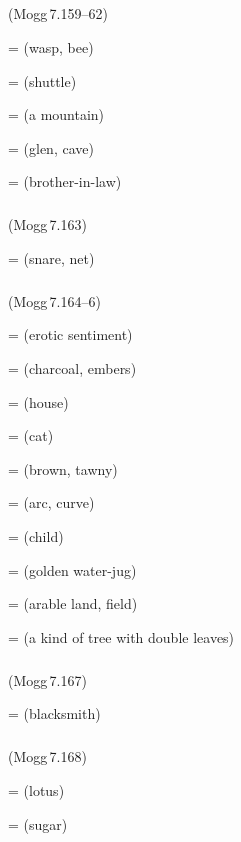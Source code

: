 \subparagraph*{} (Mogg\,7.159--62)\label{pacckx:ara}

 =  (wasp, bee)\par
{} =  (shuttle)\par
{} =  (a mountain)\par
{} =  (glen, cave)\par
{} =  (brother-in-law)\par

\subparagraph*{} (Mogg\,7.163)\label{pacckx:aradna}

 =  (snare, net)\par

\subparagraph*{} (Mogg\,7.164--6)\label{pacckx:aara}

 =  (erotic sentiment)\par
{} =  (charcoal, embers)\par
{} =  (house)\par
{} =  (cat)\par
{} =  (brown, tawny)\par
{} =  (arc, curve)\par
{} =  (child)\par
{} =  (golden water-jug)\par
{} =  (arable land, field)\par
{} =  (a kind of tree with double leaves)\par

\subparagraph*{} (Mogg\,7.167)\label{pacckx:maara}

 =  (blacksmith)\par

\subparagraph*{} (Mogg\,7.168)\label{pacckx:khara}

 =  (lotus)\par
{} =  (sugar)\par

